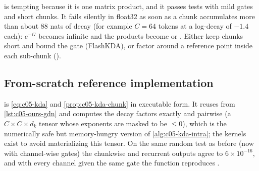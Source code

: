 \begin{pitfall}
 is tempting because it is one matrix product, and it passes tests with
mild gates and short chunks. It fails silently in float32 as soon as a chunk accumulates more than
about 88 nats of decay (for example $C = 64$ tokens at a log-decay of $-1.4$ each): $e^{-G}$ becomes
infinite and the products become  or . Either keep chunks short and bound the
gate (FlashKDA), or factor around a reference point inside each sub-chunk (\fla{}).
\end{pitfall}

\subsection{From-scratch reference implementation}

 is \cref{eq:c05-kda} and \cref{prop:c05-kda-chunk} in executable form. It
reuses  from \cref{lst:c05-ours-gdn} and computes the decay factors exactly and
pairwise (a $C\times C\times d_k$ tensor whose exponents are masked to be $\le 0$), which is the
numerically safe but memory-hungry version of \cref{alg:c05-kda-intra}; the kernels exist to
avoid materializing this tensor. On the same random test as before (now with channel-wise gates)
the chunkwise and recurrent outputs agree to $6\times10^{-16}$, and with every channel given the
same gate the function reproduces .

